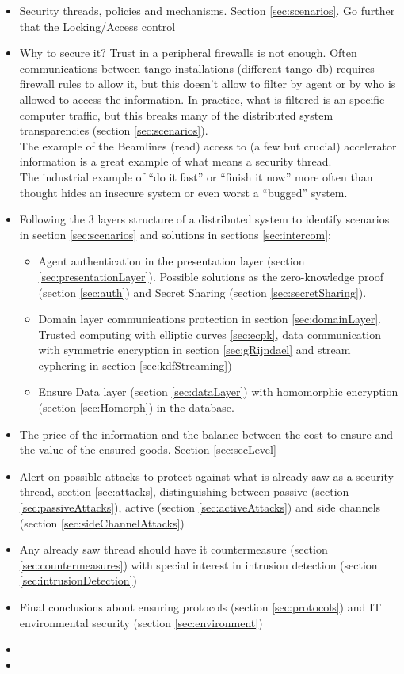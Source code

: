 \documentclass[10pt,a4paper,twoside]{llncs}
\begin{document}
\begin{itemize}
 \item Security threads, policies and mechanisms. Section \ref{sec:scenarios}. Go further that the Locking/Access control
 \item Why to secure it? Trust in a peripheral firewalls is not enough. Often communications between tango installations (different tango-db) requires firewall rules to allow it, but this doesn't allow to filter by agent or by who is allowed to access the information. In practice, what is filtered is an specific computer traffic, but this breaks many of the distributed system transparencies (section \ref{sec:scenarios}).\\ The example of the Beamlines (read) access to (a few but crucial) accelerator information is a great example of what means a security thread.\\The industrial example of ``do it fast'' or ``finish it now'' more often than thought hides an insecure system or even worst a ``bugged'' system. 
  \\
 \item Following the 3 layers structure of a distributed system \cite{TanenbaumDistr} to identify scenarios in section \ref{sec:scenarios} and solutions in sections \ref{sec:intercom}:
 \begin{itemize}
 \item Agent authentication in the presentation layer (section \ref{sec:presentationLayer}). Possible solutions as the zero-knowledge proof (section \ref{sec:auth}) and Secret Sharing (section \ref{sec:secretSharing}).
 \item Domain layer communications protection in section \ref{sec:domainLayer}. Trusted computing with elliptic curves \ref{sec:ecpk}, data communication with symmetric encryption in section \ref{sec:gRijndael} and stream cyphering in section \ref{sec:kdfStreaming})
 \item Ensure Data layer (section \ref{sec:dataLayer}) with homomorphic encryption (section \ref{sec:Homorph}) in the database.
 \end{itemize}
 \item The price of the information and the balance between the cost to ensure and the value of the ensured goods. Section \ref{sec:secLevel}
 \item Alert on possible attacks to protect against what is already saw as a security thread, section \ref{sec:attacks}, distinguishing between passive (section \ref{sec:passiveAttacks}), active (section \ref{sec:activeAttacks}) and side channels (section \ref{sec:sideChannelAttacks})
 \item Any already saw thread should have it countermeasure (section \ref{sec:countermeasures}) with special interest in intrusion detection (section \ref{sec:intrusionDetection})
 \item Final conclusions about ensuring protocols (section \ref{sec:protocols}) and IT environmental security (section \ref{sec:environment})
 \item
 \item
\end{itemize}
\end{document}

